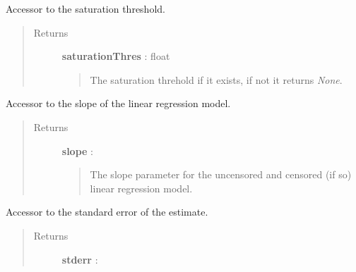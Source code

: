 \documentclass[letterpaper,10pt,english]{sphinxmanual}
\begin{document}
\begin{fulllineitems}
\begin{fulllineitems}
\label{_generated/otpod.UnivariateLinearModelAnalysis:otpod.UnivariateLinearModelAnalysis.getSaturationThreshold}
Accessor to the saturation threshold.
\begin{quote}\begin{description}
\item[{Returns}] \leavevmode
\textbf{saturationThres} : float
\begin{quote}

The saturation threhold if it exists, if not it returns \emph{None}.
\end{quote}

\end{description}\end{quote}

\end{fulllineitems}


\begin{fulllineitems}
\label{_generated/otpod.UnivariateLinearModelAnalysis:otpod.UnivariateLinearModelAnalysis.getSlope}
Accessor to the slope of the linear regression model.
\begin{quote}\begin{description}
\item[{Returns}] \leavevmode
\textbf{slope} : \href{http://doc.openturns.org/openturns-latest/sphinx/user\_manual/\_generated/openturns.NumericalPoint.html\#openturns.NumericalPoint}{}
\begin{quote}

The slope parameter for the uncensored and censored (if so) linear
regression model.
\end{quote}

\end{description}\end{quote}

\end{fulllineitems}


\begin{fulllineitems}
\label{_generated/otpod.UnivariateLinearModelAnalysis:otpod.UnivariateLinearModelAnalysis.getStandardError}
Accessor to the standard error of the estimate.
\begin{quote}\begin{description}
\item[{Returns}] \leavevmode
\textbf{stderr} : \href{http://doc.openturns.org/openturns-latest/sphinx/user\_manual/\_generated/openturns.NumericalPoint.html\#openturns.NumericalPoint}{}
\begin{quote}


\end{quote}
\end{description}
\end{quote}
\end{fulllineitems}
\end{fulllineitems}
\end{document}
